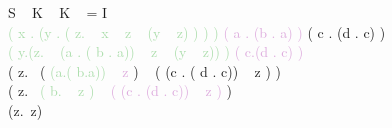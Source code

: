 
\def\l{\lambda}

S ~ K ~ K ~ = I\\

\textcolor{#ada}{
    \Big(
        	\l x . \big(\l y . \big( \l z. ~ x ~ z ~ (y ~ z) \big) \big)
    \Big)
}
\textcolor{#dad}{
    \Big(
        \l a . (\l b . a)
    \Big)
}
\Big(
    \l c . (\l d . c)
\Big)
~
\underset{
    \textcolor{ddaadd}{
        (\l a.(\l b . a))
    }
    ~ \mapsto ~
    \textcolor{aaddaa}{
        x
    }
}{
    \overset{\beta}\longrightarrow
}
\\

\textcolor{#ada}{
    \Big(
        \l y.\big(\l z. ~ (\l a . ( \l b . a)) ~ z ~ (y ~ z)\big)
    \Big)
}
\textcolor{#dad}{
    \Big(
        \l c.(\l d . c)
    \Big)
}
~
\underset{
    \textcolor{ddaadd}{
        (\l c . (\l d . c))
    }
    ~\mapsto~
    \textcolor{aaddaa}{
        y
    }
}{
    \overset{\beta}\longrightarrow
}
\\

\Big(
    \l z.~
    \big(
        \textcolor{#ada}{
            (\l a.( \l b.a))
        }
        ~
        \textcolor{#dad}{
            z
        }
    \big)
    ~
    \big(
        (\l c . ( \l d . c)) ~ z
    \big)
\Big)
~
\underset{
    \textcolor{ddaadd}{
        z
    }
    ~\mapsto~
    \textcolor{aaddaa}{
        a
    }
}{
    \overset{\beta}\longrightarrow
}
\\

\Big(
    \l z.~
    \textcolor{#ada}{
        \big(
            \l b. ~ z
        \big)
    }
    ~
    \textcolor{#dad}{
        \big(
            (\l c . (\l d . c)) ~ z
        \big)
    }
\Big)
~
\underset{
    \textcolor{ddaadd}{
        ((\l c . ( \l d . c)) ~ z )
    }
    ~\mapsto~
    \textcolor{aaddaa}{
        b
    }
}{
    \overset{\beta}\longrightarrow
}
\\

(\l z.~z)